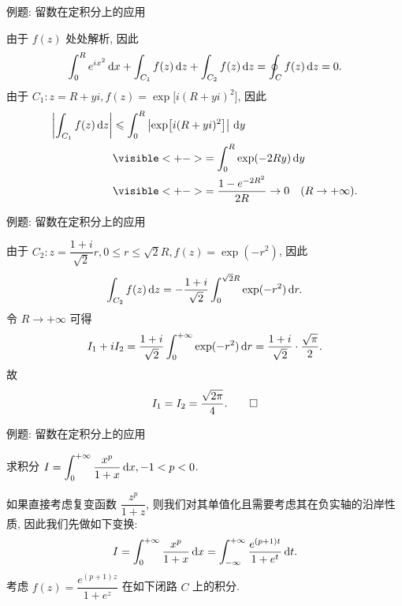 \begin{frame}{例题: 留数在定积分上的应用}
\begin{solutionc}
由于 $f(z)$ 处处解析, 因此
\[\int_0^Re^{ix^2}\,\mathrm{d} x+\int_{C_1}f(z)\,\mathrm{d} z+\int_{C_2}f(z)\,\mathrm{d} z=\oint_Cf(z)\,\mathrm{d} z=0.\]
\onslide<+->
由于 $C_1:z=R+yi,f(z)=\exp\bigl[i(R+yi)^2\bigr]$,
\onslide<+->
因此
\begin{align*}
\abs{\int_{C_1}f(z)\diff z}&\le\int_0^R \abs{\exp\bigl[i(R+yi)^2\bigr]}\diff y\\
&\visible<+->{=\int_0^R\exp(-2Ry)\diff y}\\
&\visible<+->{=\frac{1-e^{-2R^2}}{2R}\to0 \quad(R\to+\infty).}
\end{align*}
\end{solutionc}
\end{frame}


\begin{frame}{例题: 留数在定积分上的应用}
\begin{solutione}
由于 $C_2:z=\dfrac{1+i}{\sqrt 2}r,0\le r\le\sqrt2R,f(z)=\exp(-r^2)$,
\onslide<+->
因此
\[\int_{C_2}f(z)\,\mathrm{d} z=-\frac{1+i}{\sqrt 2}\int_0^{\sqrt 2R}\exp(-r^2)\,\mathrm{d} r.\]
\onslide<+->
令 $R\to+\infty$ 可得
\[I_1+iI_2=\frac{1+i}{\sqrt 2}\int_0^{+\infty}\exp(-r^2)\,\mathrm{d} r=\frac{1+i}{\sqrt2}\cdot\frac{\sqrt\pi}2.\]
\onslide<+->
故
\[I_1=I_2=\frac{\sqrt{2\pi}}4.\qedhere\]
\end{solutione}
\end{frame}


\begin{frame}{例题: 留数在定积分上的应用}
\beqskip{2pt}
\begin{example}
求积分 $I=\displaystyle\int_0^{+\infty}\frac{x^p}{1+x}\,\mathrm{d} x,-1<p<0$.
\end{example}
\begin{solutions}
\indent
如果直接考虑复变函数 $\dfrac{z^p}{1+z}$, 则我们对其单值化且需要考虑其在负实轴的沿岸性质,
\onslide<+->
因此我们先做如下变换:
\[I=\int_0^{+\infty}\frac{x^p}{1+x}\,\mathrm{d} x=\int_{-\infty}^{+\infty}\frac{e^{(p+1)t}}{1+e^t}\,\mathrm{d} t.\]
\onslide<+->
考虑 $f(z)=\dfrac{e^{(p+1)z}}{1+e^z}$ 在如下闭路 $C$ 上的积分.
\vspace{-\baselineskip}
\begin{center}
\end{center}
\vspace{-0.5\baselineskip}
\end{solutions}
\endgroup
\end{frame}


